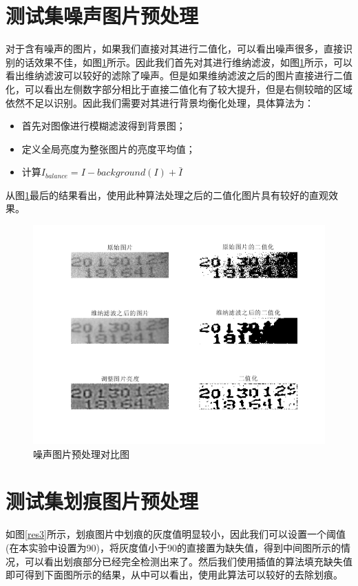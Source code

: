 \documentclass[cn]{elegantbook}
\begin{document}
\section{测试集噪声图片预处理}
\label{sec12}
对于含有噪声的图片，如果我们直接对其进行二值化，可以看出噪声很多，直接识别的话效果不佳，如图\ref{res2}所示。因此我们首先对其进行维纳滤波，如图\ref{res2}所示，可以看出维纳滤波可以较好的滤除了噪声。但是如果维纳滤波之后的图片直接进行二值化，可以看出左侧数字部分相比于直接二值化有了较大提升，但是右侧较暗的区域依然不足以识别。因此我们需要对其进行背景均衡化处理，具体算法为：

\begin{itemize}
	\item 首先对图像进行模糊滤波得到背景图；
	\item 定义全局亮度为整张图片的亮度平均值；
	\item 计算$I_{balance}=I-background(I)+\bar{I}$
\end{itemize}
从图\ref{res2}最后的结果看出，使用此种算法处理之后的二值化图片具有较好的直观效果。

\begin{figure}[!h]
	\centering
	\includegraphics[width=\textwidth]{res2}
	\caption{\label{res2}噪声图片预处理对比图}
\end{figure}

\section{测试集划痕图片预处理}
\label{sec13}
如图\ref{res3}所示，划痕图片中划痕的灰度值明显较小，因此我们可以设置一个阈值(在本实验中设置为90)，将灰度值小于90的直接置为缺失值，得到中间图所示的情况，可以看出划痕部分已经完全检测出来了。然后我们使用插值的算法填充缺失值即可得到下面图所示的结果，从中可以看出，使用此算法可以较好的去除划痕。
\end{document}
